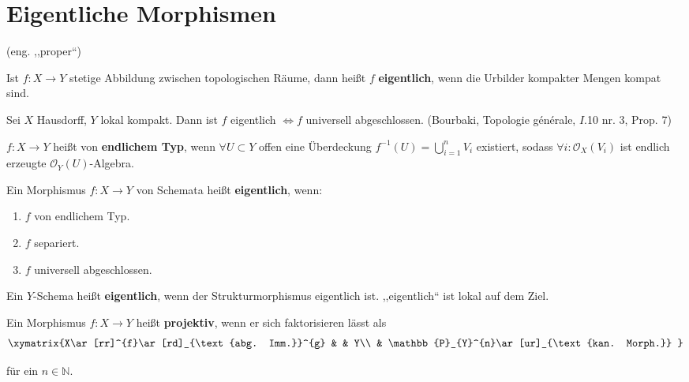 \section{Eigentliche Morphismen}

(eng. ,,proper``)\medskip{}

Ist $f:X\rightarrow Y$ stetige Abbildung zwischen topologischen Räume,
dann heißt $f$ \textbf{eigentlich}, wenn die Urbilder kompakter Mengen
kompat sind.

Sei $X$ Hausdorff, $Y$ lokal kompakt. Dann ist $f$ eigentlich $\Longleftrightarrow f$
universell abgeschlossen. (Bourbaki, Topologie générale, $I$.10 nr.
3, Prop. 7)

$f:X\rightarrow Y$ heißt von \textbf{endlichem Typ}, wenn $\forall U\subset Y$
offen eine Überdeckung $f^{-1}(U)=\bigcup_{i=1}^{n}V_{i}$ existiert,
sodass $\forall i:\mathcal{O}_{X}(V_{i})$ ist endlich erzeugte $\mathcal{O}_{Y}(U)$-Algebra.%

\begin{defn}[39]
  Ein Morphismus $f:X\rightarrow Y$ von Schemata heißt \textbf{eigentlich},
  wenn:
  \begin{enumerate}
  \item $f$ von endlichem Typ.
  \item $f$ separiert.
  \item $f$ universell abgeschlossen.
  \end{enumerate}
  Ein $Y$-Schema heißt \textbf{eigentlich}, wenn der Strukturmorphismus
  eigentlich ist. ,,eigentlich`` ist lokal auf dem Ziel.\medskip{}
\end{defn}

\begin{defn}[40]
  Ein Morphismus $f:X\rightarrow Y$ heißt \textbf{projektiv}, wenn
  er sich faktorisieren lässt als
  \[
    \xymatrix{X\ar[rr]^{f}\ar[rd]_{\text{abg. Imm.}}^{g} &  & Y\\
      & \mathbb{P}_{Y}^{n}\ar[ur]_{\text{kan. Morph.}}
    }
  \]

  für ein $n\in\mathbb{N}$.
\end{defn}

